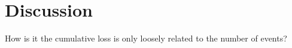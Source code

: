 \section*{Discussion}

How is it the cumulative loss is only loosely related to the number of events? 